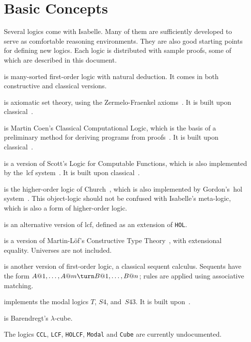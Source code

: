 \chapter{Basic Concepts}
Several logics come with Isabelle.  Many of them are sufficiently developed
to serve as comfortable reasoning environments.  They are also good
starting points for defining new logics.  Each logic is distributed with
sample proofs, some of which are described in this document.

\begin{ttdescription}
\item[\thydx{FOL}] is many-sorted first-order logic with natural
deduction.  It comes in both constructive and classical versions.

\item[\thydx{ZF}] is axiomatic set theory, using the Zermelo-Fraenkel
axioms~\cite{suppes72}.  It is built upon classical~\FOL{}.

\item[\thydx{CCL}] is Martin Coen's Classical Computational Logic,
  which is the basis of a preliminary method for deriving programs from
  proofs~\cite{coen92}.  It is built upon classical~\FOL{}.
 
\item[\thydx{LCF}] is a version of Scott's Logic for Computable
  Functions, which is also implemented by the~{\sc lcf}
  system~\cite{paulson87}.  It is built upon classical~\FOL{}.

\item[\thydx{HOL}] is the higher-order logic of Church~\cite{church40},
which is also implemented by Gordon's~{\sc hol} system~\cite{mgordon88a}.  This
object-logic should not be confused with Isabelle's meta-logic, which is
also a form of higher-order logic.

\item[\thydx{HOLCF}] is an alternative version of {\sc lcf}, defined
  as an extension of {\tt HOL}\@.
 
\item[\thydx{CTT}] is a version of Martin-L\"of's Constructive Type
Theory~\cite{nordstrom90}, with extensional equality.  Universes are not
included.
 
\item[\thydx{LK}] is another version of first-order logic, a classical
sequent calculus.  Sequents have the form $A@1,\ldots,A@m\turn
B@1,\ldots,B@n$; rules are applied using associative matching.

\item[\thydx{Modal}] implements the modal logics $T$, $S4$,
  and~$S43$.  It is built upon~\LK{}.

\item[\thydx{Cube}] is Barendregt's $\lambda$-cube.
\end{ttdescription}
The logics {\tt CCL}, {\tt LCF}, {\tt HOLCF}, {\tt Modal} and {\tt Cube}
are currently undocumented.

